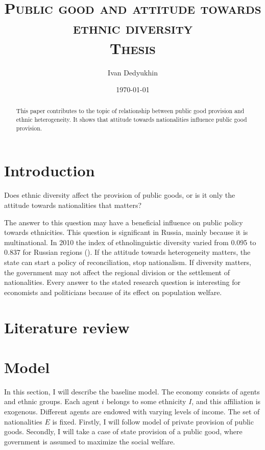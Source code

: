 \documentclass[letterpaper,11pt]{article}
\begin{document}
\title{\textsc{Public good and attitude towards ethnic diversity} \\ \vspace{.5cm} \large \textsc{Thesis}}
\author{Ivan Dedyukhin}
\date{\today}
\maketitle

\begin{abstract}
 This paper contributes to the topic of relationship between public good provision and ethnic heterogeneity. It shows that attitude towards nationalities influence public good provision.    
\end{abstract}

\newpage

\tableofcontents

\newpage

\section{Introduction}

Does ethnic diversity affect the provision of public goods, or is it only the attitude towards nationalities that matters?

The answer to this question may have a beneficial influence on public policy towards ethnicities. This question is significant in Russia, mainly because it is multinational. In 2010 the index of ethnolinguistic diversity varied from 0.095 to 0.837 for Russian regions (\cite{Russia}). If the attitude towards heterogeneity matters, the state can start a policy of reconciliation, stop nationalism. If diversity matters, the government may not affect the regional division or the settlement of nationalities. Every answer to the stated research question is interesting for economists and politicians because of its effect on population welfare. 

\section{Literature review}



\section{Model}

In this section, I will describe the baseline model. The economy consists of agents and ethnic groups. Each agent $i$ belongs to some ethnicity $I$, and this affiliation is exogenous. Different agents are endowed with varying levels of income. The set of nationalities $E$ is fixed. Firstly, I will follow \cite{BBV} model of private provision of public goods. Secondly, I will take a case of state provision of a public good, where government is assumed to maximize the social welfare.
\end{document}
